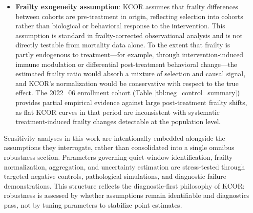 \documentclass[
]{article}
\begin{document}
\begin{itemize}
  \textbf{Non-gamma frailty}: The KCOR framework assumes that selection
  acts approximately multiplicatively through a time-invariant frailty
  distribution, for which the gamma family provides a convenient and
  empirically testable approximation. In settings where depletion
  dynamics are driven by more complex mechanisms, such as time-varying
  frailty variance, interacting risk factors, or shared frailty
  correlations within subgroups, the curvature structure exploited by
  KCOR may be misspecified. In such cases, KCOR diagnostics, for example
  poor curvature fit or unstable fitted frailty variance estimates,
  serve as indicators of model inadequacy rather than targets for
  parameter tuning. Extending the framework to accommodate dynamic or
  correlated frailty structures would require explicit model
  generalization rather than modification of KCOR normalization steps
  and is left to future work. Empirically, KCOR's validity depends on
  curvature removal rather than on the literal truth of the gamma
  family; alternative frailty distributions that generate similar
  depletion geometry may yield similar normalization.
\item
  \textbf{Frailty exogeneity assumption}: KCOR assumes that frailty
  differences between cohorts are pre-treatment in origin, reflecting
  selection into cohorts rather than biological or behavioral response
  to the intervention. This assumption is standard in frailty-corrected
  observational analysis and is not directly testable from mortality
  data alone. To the extent that frailty is partly endogenous to
  treatment---for example, through intervention-induced immune
  modulation or differential post-treatment behavioral change---the
  estimated frailty ratio would absorb a mixture of selection and causal
  signal, and KCOR's normalization would be conservative with respect to
  the true effect. The 2022\_06 enrollment cohort (Table
  \ref{tbl:neg_control_summary}) provides partial empirical evidence
  against large post-treatment frailty shifts, as flat KCOR curves in
  that period are inconsistent with systematic treatment-induced frailty
  changes detectable at the population level.
\end{itemize}

Sensitivity analyses in this work are intentionally embedded alongside
the assumptions they interrogate, rather than consolidated into a single
omnibus robustness section. Parameters governing quiet-window
identification, frailty normalization, aggregation, and uncertainty
estimation are stress-tested through targeted negative controls,
pathological simulations, and diagnostic failure demonstrations. This
structure reflects the diagnostic-first philosophy of KCOR: robustness
is assessed by whether assumptions remain identifiable and diagnostics
pass, not by tuning parameters to stabilize point estimates.
\end{document}
